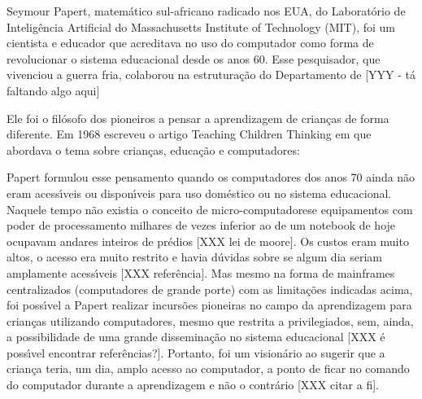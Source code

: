 \documentclass[
12pt,		%
openright,	%
twoside,  %
a4paper,			%
chapter=TITLE,		%
english,			%
french,				%
spanish,			%
brazil				%
]{USPSC-classe/USPSC_RedarTex}
\begin{document}
Seymour Papert, matem\'atico sul-africano radicado nos EUA, do Laborat\'orio de Intelig\^encia Artificial do Massachusetts Institute of Technology (MIT), foi um  cientista e educador que acreditava  no  uso do computador como forma de revolucionar o sistema  educacional  desde os anos 60. Esse pesquisador, que vivenciou a guerra fria, colaborou na estrutura\c{c}\~ao do Departamento de  [YYY - t\'a faltando algo aqui]








Ele foi o \textquotedbl fil\'osofo dos pioneiros a pensar a aprendizagem de crian\c{c}as de forma diferente. Em 1968 escreveu o artigo \textquotedbl  Teaching Children Thinking \textquotedbl   em que abordava  o tema sobre crian\c{c}as, educa\c{c}\~ao e computadores: 









\noindent\begin{center}\mbox{\centering{}}\end{center}


Papert formulou esse pensamento quando os computadores dos anos 70 ainda n\~ao eram acess\'{\i}veis ou dispon\'{\i}veis para uso dom\'estico ou no sistema educacional. Naquele tempo n\~ao existia o conceito de \textquotedbl micro-computadores\textquotedbl  e equipamentos com poder de processamento milhares de vezes inferior ao de um notebook de hoje ocupavam andares inteiros de pr\'edios [XXX lei de moore]. Os custos eram muito altos, o acesso era muito restrito e havia d\'uvidas sobre se algum dia seriam amplamente acess\'{\i}veis [XXX refer\^encia]. Mas mesmo na forma de mainframes centralizados (computadores de grande porte) com as limita\c{c}\~oes indicadas acima, foi poss\'{\i}vel a Papert realizar incurs\~oes pioneiras no campo da aprendizagem para crian\c{c}as utilizando computadores, mesmo que restrita a privilegiados, sem, ainda, a possibilidade de uma grande dissemina\c{c}\~ao no sistema educacional [XXX \'e poss\'{\i}vel encontrar refer\^encias?].  Portanto, foi um vision\'ario ao sugerir que a crian\c{c}a teria, um dia, amplo acesso ao computador, a ponto de ficar no comando do computador durante a aprendizagem e n\~ao o contr\'ario [XXX citar a fi].
\end{document}
